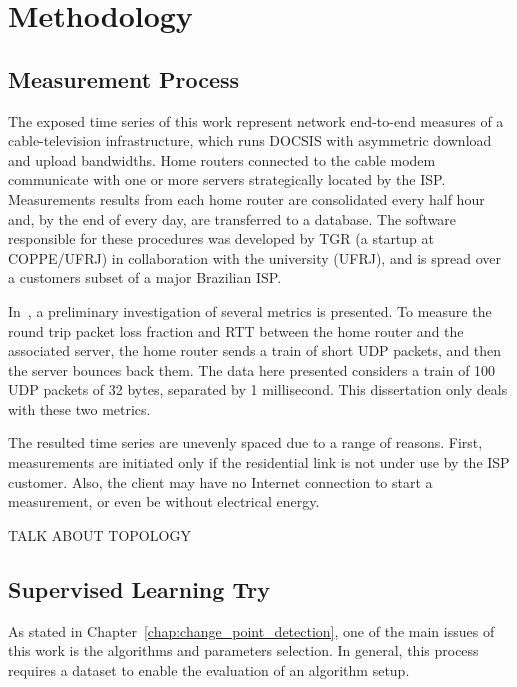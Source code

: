 \chapter{Methodology}
\label{chap:methodology}

\section{Measurement Process}

The exposed time series of this work represent network end-to-end measures of a
cable-television infrastructure, which runs DOCSIS with asymmetric download and
upload bandwidths. Home routers connected to the cable modem communicate with
one or more servers strategically located by the ISP\@. Measurements results
from
each home router are consolidated every half hour and, by the end of every day,
are transferred to a database. The software responsible for these procedures was
developed by TGR (a startup at COPPE/UFRJ) in collaboration with the university
(UFRJ), and is spread over a customers subset of a major Brazilian ISP\@.

In~\cite{a_preliminary_performance_measurement_study_of_residential_broadband_services_in_brazil},
a preliminary investigation of several metrics is presented. To measure the
round
trip packet loss fraction and RTT between the home router and the associated
server, the
home router sends a train of short UDP packets, and then the server bounces back
them. The data here presented considers a train of 100 UDP packets of 32 bytes,
separated by 1 millisecond. This dissertation only deals with these two
metrics.

The resulted time series are unevenly spaced due to a range of reasons. First,
measurements are initiated only if the residential link is not under use by the
ISP customer. Also, the client may have no Internet connection to start a
measurement, or even be without electrical energy.

TALK ABOUT TOPOLOGY

\section{Supervised Learning Try}

As stated in Chapter~\ref{chap:change_point_detection}, one of the main issues
of this work is the algorithms and parameters selection.
In general, this process requires a dataset to enable the evaluation of an
algorithm setup.

